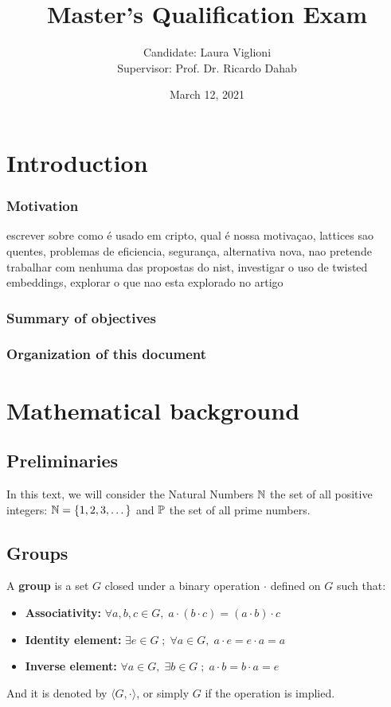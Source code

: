 \documentclass[a4paper,12pt]{article}
\author{Candidate: Laura Viglioni \\ Supervisor: Prof. Dr. Ricardo Dahab}
\date{March 12, 2021}
\title{Master’s Qualification Exam}
\begin{document}
\maketitle



\section{Introduction}
\label{sec:org9428d99}
\subsubsection*{Motivation}
\label{sec:orgff530ac}
escrever sobre como é usado em cripto, qual é nossa motivaçao, lattices sao quentes, problemas de eficiencia, segurança, alternativa nova, nao pretende trabalhar com nenhuma das propostas do nist, investigar o uso de twisted embeddings, explorar o que nao esta explorado no artigo
\subsubsection*{Summary of objectives}
\label{sec:orga9274cf}
\subsubsection*{Organization of this document}
\label{sec:org2e16f3e}
\section{Mathematical background}
\label{sec:org134f49d}
\subsection{Preliminaries}
\label{sec:orga7c08aa}
In this text, we will consider the Natural Numbers \(\N\) the set of all positive integers: \(\N = \{1,2,3,\dots\}\) and \(\P\) the set of all prime numbers. 
\subsection{Groups}
\label{sec:org91937d4}

\begin{definition}
  A \textbf{group} is a set $G$ closed under a binary operation $\cdot$ defined on $G$ such
  that:
  \begin{itemize}
  \item \textbf{Associativity: } $\forall a,b,c \in G, \; a\cdot(b\cdot c) = (a\cdot b)\cdot c$
  \item \textbf{Identity element: } $\exists e \in G \; ; \; \forall a \in G, \; a\cdot e = e\cdot a = a$
  \item \textbf{Inverse element: } $\forall a \in G, \; \exists b \in G \; ; \; a\cdot b = b \cdot a = e$
  \end{itemize}
And it is denoted by $\langle G,\cdot\rangle$, or simply $G$ if the operation is implied.
\end{definition}
\end{document}
